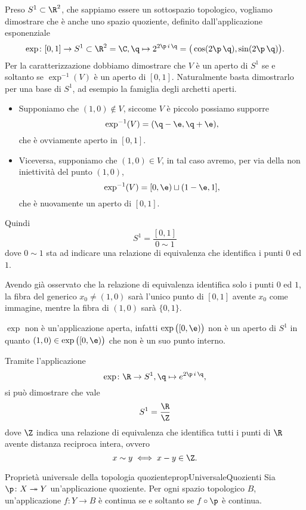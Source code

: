 \begin{ese}
	Preso \(S^1 \subset \R^2\), che sappiamo essere un sottospazio topologico, vogliamo dimostrare che è anche uno spazio quoziente, definito dall'applicazione esponenziale
	\[
		\exp\colon [0,1] \to S^1\subset \R^2=\C, \q \mapsto 2^{2\p\,i\,\q}=\big(\cos(2\p\,\q),\sin(2\p\,\q)\big).
	\]
	Per la caratterizzazione dobbiamo dimostrare che \(V\) è un aperto di \(S^1\) se e soltanto se \(\exp^{-1}(V)\) è un aperto di \([0,1]\). Naturalmente basta dimostrarlo per una base di \(S^1\), ad esempio la famiglia degli archetti aperti.
	\begin{itemize}
		\item Supponiamo che \((1,0)\notin V\), siccome \(V\) è piccolo possiamo supporre
		      \[
			      \exp^{-1}(V) = (\q-\e,\q+\e),
		      \]
		      che è ovviamente aperto in \([0,1]\).
		\item Viceversa, supponiamo che \((1,0)\in V\), in tal caso avremo, per via della non iniettività del punto \((1,0)\),
		      \[
			      \exp^{-1}(V) = [0,\e)\sqcup (1-\e,1],
		      \]
		      che è nuovamente un aperto di \([0,1]\).
	\end{itemize}
	Quindi
	\[
		S^1 = \frac{[0,1]}{0\sim 1}
	\]
	dove \(0\sim 1\) sta ad indicare una relazione di equivalenza che identifica i punti \(0\) ed \(1\).
\end{ese}

\begin{oss}
	Avendo già osservato che la relazione di equivalenza identifica solo i punti \(0\) ed \(1\), la fibra del generico \(x_0\neq (1,0)\) sarà l'unico punto di \([0,1]\) avente \(x_0\) come immagine, mentre la fibra di \((1,0)\) sarà \(\{0,1\}\).
\end{oss}

\begin{oss}
	\(\exp\) non è un'applicazione aperta, infatti \(\exp\big([0,\e)\big)\) non è un aperto di \(S^1\) in quanto \((1,0)\in\exp\big([0,\e)\big)\) che non è un suo punto interno.
\end{oss}

\begin{oss}
	Tramite l'applicazione
	\[
		\exp\colon \R \to S^1,\q \mapsto e^{2\p\,i\,\q},
	\]
	si può dimostrare che vale
	\[
		S^1 = \frac{\R}{\Z}
	\]
	dove \(\Z\) indica una relazione di equivalenza che identifica tutti i punti di \(\R\) avente distanza reciproca intera, ovvero
	\[
		x \sim y \iff x-y \in \Z.
	\]
\end{oss}

\begin{teor}{Proprietà universale della topologia quoziente}{propUniversaleQuozienti}
	Sia \(\p\colon X \twoheadrightarrow Y\) un'applicazione quoziente.
	Per ogni spazio topologico \(B\), un'applicazione \(f\colon Y \to B\) è continua se e soltanto se \(f\circ \p\) è continua.
\end{teor}

